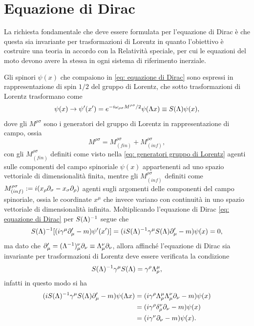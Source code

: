 \chapter{Equazione di Dirac}
La richiesta fondamentale che deve essere formulata per l'equazione di Dirac è che questa sia invariante per trasformazioni di Lorentz in quanto l'obiettivo è costruire una teoria in accordo con la Relatività speciale, per cui le equazioni del moto devono avere la stessa in ogni sistema di riferimento inerziale. 

Gli spinori $\psi(x)$ che compaiono in \eqref{eq: equazione di Dirac} sono espressi in rappresentazione di spin $1/2$ del gruppo di Lorentz, che sotto trasformazioni di Lorentz trasformano come
\begin{equation}
    \psi(x)\to\psi'(x') = e^{-i\omega_{\rho\sigma}M^{\rho\sigma}/2}\psi(\Lambda x) \equiv S(\Lambda)\psi(x),
\end{equation}
dove gli $M^{\rho\sigma}$ sono i generatori del gruppo di Lorentz in rappresentazione di campo, ossia
\begin{equation}
    M^{\rho\sigma} = M^{\rho\sigma}_{(fin)} + M^{\rho\sigma}_{(inf)},
\end{equation}
con gli $M^{\rho\sigma}_{(fin)}$ definiti come visto nella \eqref{eq: generatori gruppo di Lorentz} agenti sulle componenti del campo spinoriale $\psi(x)$ appartenenti ad uno spazio vettoriale di dimensionalità finita, mentre gli $M^{\rho\sigma}_{(inf)}$ definiti come $M^{\rho\sigma}_{(inf)} := i(x_\rho\partial_\sigma - x_\sigma\partial_\rho)$ agenti sugli argomenti delle componenti del campo spinoriale, ossia le coordinate $x^\mu$ che invece variano con continuità in uno spazio vettoriale di dimensionalità infinita. Moltiplicando l'equazione di Dirac \eqref{eq: equazione di Dirac} per $S(\Lambda)^{-1}$ segue che
\begin{equation}
    S(\Lambda)^{-1}[(i\gamma^\mu\partial'_\mu - m)\psi'(x')] = (iS(\Lambda)^{-1}\gamma^\mu S(\Lambda)\partial_\mu' - m)\psi(x) = 0,
\end{equation}
ma dato che $\partial_\mu'= (\Lambda^{-1})_\mu^\nu\partial_\nu \equiv \Lambda_\mu^\nu\partial_\nu$, allora affinché l'equazione di Dirac sia invariante per trasformazioni di Lorentz deve essere verificata la condizione
\begin{equation}
    S(\Lambda)^{-1}\gamma^\mu S(\Lambda) = \gamma^\rho\Lambda^\mu_\rho,
\end{equation}
infatti in questo modo si ha
\begin{equation}
    \begin{split}
        (iS(\Lambda)^{-1}\gamma^\mu S(\Lambda)\partial_\mu' - m)\psi(\Lambda x) &= (i\gamma^\rho\Lambda^\mu_\rho\Lambda_\mu^\nu\partial_\nu - m)\psi(x) \\
        &= (i\gamma^\rho\delta^\nu_\rho\partial_\nu -m)\psi(x) \\
        &= (i\gamma^\nu\partial_\nu - m)\psi(x).
        \end{split}
\end{equation}
